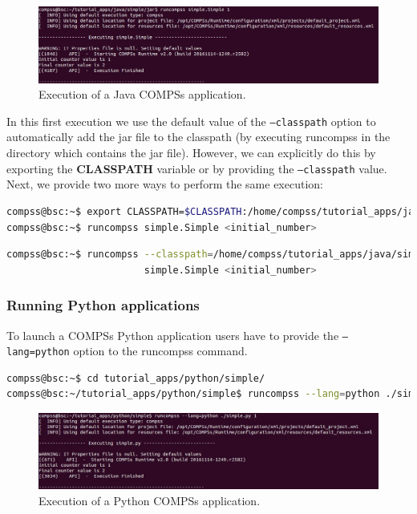 \begin{figure}[h!]
  \centering
    \includegraphics[width=\textwidth]{./Sections/2_Execution/Figures/java_execution.jpeg}
    \caption{Execution of a Java COMPSs application.}
    \label{fig:java_execution}
\end{figure}
\vspace{-0.4cm}

In this first execution we use the default value of the \texttt{--classpath} option to automatically add the jar
file to the classpath (by executing runcompss in the directory which contains the jar file). However,
we can explicitly do this by exporting the \textbf{CLASSPATH} variable or by providing the 
\texttt{--classpath} value. Next, we provide two more ways to perform the same execution:

\begin{lstlisting}[language=bash]
compss@bsc:~$ export CLASSPATH=$CLASSPATH:/home/compss/tutorial_apps/java/simple/jar/simple.jar
compss@bsc:~$ runcompss simple.Simple <initial_number>
\end{lstlisting}

\begin{lstlisting}[language=bash]
compss@bsc:~$ runcompss --classpath=/home/compss/tutorial_apps/java/simple/jar/simple.jar 
                        simple.Simple <initial_number>
\end{lstlisting}


\subsubsection{Running Python applications}
To launch a COMPSs Python application users have to provide the \texttt{--lang=python} option to the runcompss command. 

\begin{lstlisting}[language=bash]
compss@bsc:~$ cd tutorial_apps/python/simple/
compss@bsc:~/tutorial_apps/python/simple$ runcompss --lang=python ./simple.py <initial_number>
\end{lstlisting}

\begin{figure}[h!]
  \centering
    \includegraphics[width=\textwidth]{./Sections/2_Execution/Figures/python_execution.jpeg}
    \caption{Execution of a Python COMPSs application.}
    \label{fig:python_execution}
\end{figure}
\vspace{-0.4cm}


